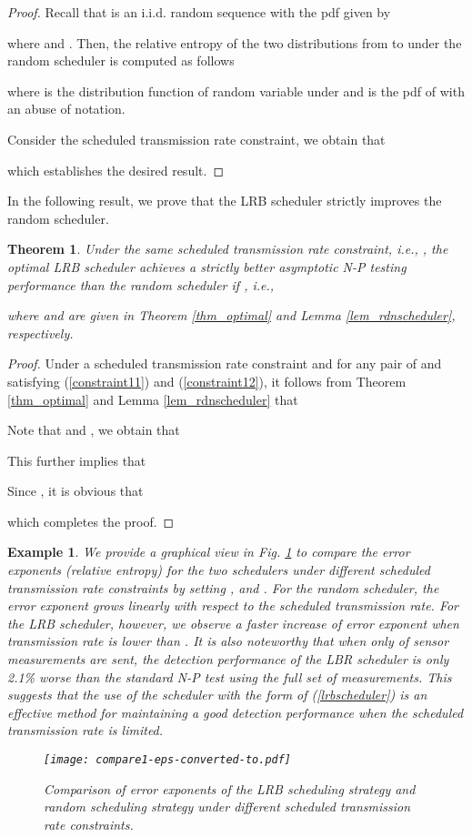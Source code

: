 \documentclass[journal]{IEEEtran}
\newtheorem{thm}{Theorem}
\newtheorem{exam}{Example}
\begin{document}
\begin{proof}
Recall that  is an i.i.d. random sequence with the pdf given by

where  and .
Then, the relative entropy of the two distributions  from  to  under the random scheduler is computed as follows

where  is the distribution function of random variable  under  and  is the pdf of  with an abuse of notation.

Consider the scheduled transmission rate constraint, we obtain that

which establishes the desired result.
\end{proof}
In the following result, we prove that the LRB scheduler strictly improves the random scheduler.
\begin{thm}Under the same scheduled transmission rate constraint, i.e., , the optimal LRB scheduler achieves a strictly better asymptotic N-P testing performance than the random scheduler if , i.e.,

where  and  are given in Theorem \ref{thm_optimal} and Lemma \ref{lem_rdnscheduler}, respectively.
\end{thm}
\begin{proof}
Under a scheduled transmission rate constraint  and for any pair of  and  satisfying (\ref{constraint11}) and (\ref{constraint12}), it follows from Theorem \ref{thm_optimal} and Lemma \ref{lem_rdnscheduler} that

Note that  and , we obtain that

This further implies that
 

Since , it is obvious that

which completes the proof. \end{proof}
\begin{exam}
\label{exam1}
We provide a graphical view in Fig. \ref{fig_comparison} to compare the error exponents (relative entropy) for the two schedulers under different scheduled transmission rate constraints by setting ,  and . For the random scheduler, the error exponent grows linearly with respect to the scheduled transmission rate. For the LRB scheduler, however, we observe a faster increase of error exponent  when transmission rate is lower than . It is also noteworthy that when only  of sensor measurements are sent, the detection performance of the LBR scheduler is only 2.1\% worse than the standard N-P test using the full set of measurements. This suggests that the use of the scheduler with the form of (\ref{lrbscheduler}) is an effective method for maintaining a good detection performance when the scheduled transmission rate is limited.

\begin{figure}
  \centering
  \texttt{[image: compare1-eps-converted-to.pdf]}
    \caption{ Comparison of error exponents of the LRB scheduling strategy and random scheduling strategy under different scheduled transmission rate constraints.}
    \label{fig_comparison}
\end{figure}

\end{exam}
\end{document}
